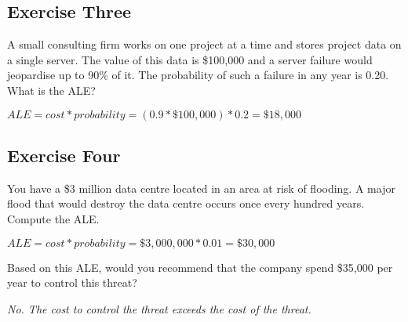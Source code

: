 \documentclass{article}
\begin{document}
\newpage

\subsection*{Exercise Three}
A small consulting firm works on one project at a time and stores project data on a single server. The value of this data is \$100,000 and a server failure would jeopardise up to 90\% of it. The probability of such a failure in any year is 0.20.  What is the ALE?

$ALE = cost * probability = (0.9 * \$100,000) * 0.2 = \$18,000 $
\vspace{75mm}

\subsection*{Exercise Four}
You have a \$3 million data centre located in an area at risk of flooding. A major flood that would destroy the data centre occurs once every hundred years. Compute the ALE.

$ALE = cost * probability = \$3,000,000 * 0.01 = \$30,000$

\vspace{60mm}

Based on this ALE, would you recommend that the company spend \$35,000 per year to control this threat?

\emph{No. The cost to control the threat exceeds the cost of the threat.}
\end{document}
